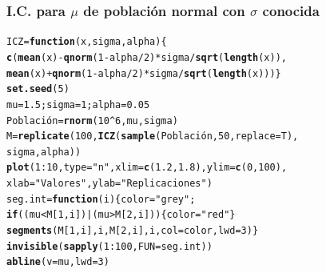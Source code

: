 \documentclass[12pt,t]{beamer}\usepackage[]{graphicx}\usepackage[]{color}
\makeatletter
\newcommand{\hlnum}[1]{\textcolor[rgb]{0.686,0.059,0.569}{#1}}%
\newcommand{\hlstr}[1]{\textcolor[rgb]{0.192,0.494,0.8}{#1}}%
\newcommand{\hlopt}[1]{\textcolor[rgb]{0,0,0}{#1}}%
\newcommand{\hlstd}[1]{\textcolor[rgb]{0.345,0.345,0.345}{#1}}%
\newcommand{\hlkwa}[1]{\textcolor[rgb]{0.161,0.373,0.58}{\textbf{#1}}}%
\newcommand{\hlkwb}[1]{\textcolor[rgb]{0.69,0.353,0.396}{#1}}%
\newcommand{\hlkwc}[1]{\textcolor[rgb]{0.333,0.667,0.333}{#1}}%
\newcommand{\hlkwd}[1]{\textcolor[rgb]{0.737,0.353,0.396}{\textbf{#1}}}%
\newenvironment{kframe}{%
 \def\at@end@of@kframe{}%
 \ifinner\ifhmode%
  \def\at@end@of@kframe{\end{minipage}}%
  \begin{minipage}{\columnwidth}%
 \fi\fi%
 \def\FrameCommand##1{\hskip\@totalleftmargin \hskip-\fboxsep
 \colorbox{shadecolor}{##1}\hskip-\fboxsep
     \hskip-\linewidth \hskip-\@totalleftmargin \hskip\columnwidth}%
 \MakeFramed {\advance\hsize-\width
   \@totalleftmargin\z@ \linewidth\hsize
   \@setminipage}}%
 {\par\unskip\endMakeFramed%
 \at@end@of@kframe}
\newenvironment{knitrout}{}{} %
\theoremstyle{plain}
\theoremstyle{definition}
\makeatother
\begin{document}
\begin{frame}[fragile]
\frametitle{I.C. para $\mu$ de población normal con $\sigma$ conocida}
\vspace*{-4ex}

\begin{knitrout}\footnotesize
{}\color{fgcolor}\begin{kframe}
\begin{alltt}
\hlstd{ICZ}\hlkwb{=}\hlkwa{function}\hlstd{(}\hlkwc{x}\hlstd{,}\hlkwc{sigma}\hlstd{,}\hlkwc{alpha}\hlstd{)\{}
  \hlkwd{c}\hlstd{(}\hlkwd{mean}\hlstd{(x)}\hlopt{-}\hlkwd{qnorm}\hlstd{(}\hlnum{1}\hlopt{-}\hlstd{alpha}\hlopt{/}\hlnum{2}\hlstd{)}\hlopt{*}\hlstd{sigma}\hlopt{/}\hlkwd{sqrt}\hlstd{(}\hlkwd{length}\hlstd{(x)),}
  \hlkwd{mean}\hlstd{(x)}\hlopt{+}\hlkwd{qnorm}\hlstd{(}\hlnum{1}\hlopt{-}\hlstd{alpha}\hlopt{/}\hlnum{2}\hlstd{)}\hlopt{*}\hlstd{sigma}\hlopt{/}\hlkwd{sqrt}\hlstd{(}\hlkwd{length}\hlstd{(x)))\}}
\hlkwd{set.seed}\hlstd{(}\hlnum{5}\hlstd{)}
\hlstd{mu}\hlkwb{=}\hlnum{1.5}\hlstd{; sigma}\hlkwb{=}\hlnum{1}\hlstd{; alpha}\hlkwb{=}\hlnum{0.05}
\hlstd{Población}\hlkwb{=}\hlkwd{rnorm}\hlstd{(}\hlnum{10}\hlopt{^}\hlnum{6}\hlstd{,mu,sigma)}
\hlstd{M}\hlkwb{=}\hlkwd{replicate}\hlstd{(}\hlnum{100}\hlstd{,}\hlkwd{ICZ}\hlstd{(}\hlkwd{sample}\hlstd{(Población,}\hlnum{50}\hlstd{,}\hlkwc{replace}\hlstd{=T),}
 \hlstd{sigma,alpha))}
\hlkwd{plot}\hlstd{(}\hlnum{1}\hlopt{:}\hlnum{10}\hlstd{,}\hlkwc{type}\hlstd{=}\hlstr{"n"}\hlstd{,}\hlkwc{xlim}\hlstd{=}\hlkwd{c}\hlstd{(}\hlnum{1.2}\hlstd{,}\hlnum{1.8}\hlstd{),}\hlkwc{ylim}\hlstd{=}\hlkwd{c}\hlstd{(}\hlnum{0}\hlstd{,}\hlnum{100}\hlstd{),}
\hlkwc{xlab}\hlstd{=}\hlstr{"Valores"}\hlstd{,}\hlkwc{ylab}\hlstd{=}\hlstr{"Replicaciones"}\hlstd{)}
\hlstd{seg.int}\hlkwb{=}\hlkwa{function}\hlstd{(}\hlkwc{i}\hlstd{)\{color}\hlkwb{=}\hlstr{"grey"}\hlstd{;}
  \hlkwa{if}\hlstd{((mu}\hlopt{<}\hlstd{M[}\hlnum{1}\hlstd{,i])} \hlopt{|} \hlstd{(mu}\hlopt{>}\hlstd{M[}\hlnum{2}\hlstd{,i]))\{color} \hlkwb{=} \hlstr{"red"}\hlstd{\}}
  \hlkwd{segments}\hlstd{(M[}\hlnum{1}\hlstd{,i],i,M[}\hlnum{2}\hlstd{,i],i,}\hlkwc{col}\hlstd{=color,}\hlkwc{lwd}\hlstd{=}\hlnum{3}\hlstd{)\}}
\hlkwd{invisible}\hlstd{(}\hlkwd{sapply}\hlstd{(}\hlnum{1}\hlopt{:}\hlnum{100}\hlstd{,}\hlkwc{FUN}\hlstd{=seg.int))}
\hlkwd{abline}\hlstd{(}\hlkwc{v}\hlstd{=mu,}\hlkwc{lwd}\hlstd{=}\hlnum{3}\hlstd{)}
\end{alltt}
\end{kframe}
\end{knitrout}

\end{frame}
\end{document}
